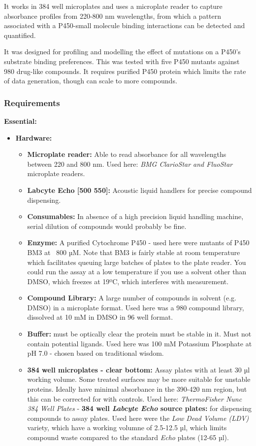 \documentclass{article}
\begin{document}
It works in 384 well microplates and uses a microplate reader to capture absorbance profiles from 220-800 nm wavelengths, from which a pattern associated with a P450-small molecule binding interactions can be detected and quantified.  

It was designed for profiling and modelling the effect of mutations on a P450's substrate binding preferences.
This was tested with five P450 mutants against 980 drug-like compounds.
It requires purified P450 protein which limits the rate of data generation, though can scale to more compounds.


\subsubsection{Requirements}

\textbf{Essential:}

\begin{itemize}
\item \textbf{Hardware:}
	\begin{itemize}
	\item \textbf{Microplate reader:} Able to read absorbance for all wavelengths between 220 and 800 nm.
		Used here: \textit{BMG ClarioStar and FluoStar} microplate readers.
	\item \textbf{Labcyte Echo [500 550]:} Acoustic liquid handlers for precise compound dispensing.
\item \textbf{Consumables:}
	In absence of a high precision liquid handling machine, serial dilution of compounds would probably be fine.
	\item \textbf{Enzyme:} A purified Cytochrome P450 - used here were mutants of P450 BM3 at ~800 µM. 
	Note that BM3 is fairly stable at room temperature which facilitates queuing large batches of plates to the plate reader.
	You could run the assay at a low temperature if you use a solvent other than DMSO, which freezes at 19ºC, which interferes with measurement.
	\item \textbf{Compound Library:} A large number of compounds in solvent (e.g. DMSO) in a microplate format.
	Used here was a 980 compound library, dissolved at 10 mM in DMSO in 96 well format.
	\item \textbf{Buffer:} must be optically clear the protein must be stable in it.
	Must not contain potential ligands.
	Used here was 100 mM Potassium Phosphate at pH 7.0 - chosen based on traditional wisdom.
	\item \textbf{384 well microplates - clear bottom:}
	Assay plates with at least 30 µl working volume. 
	Some treated surfaces may be more suitable for unstable proteins.
	Ideally have minimal absorbance in the 390-420 nm region, but this can be corrected for with controls.
			Used here: \textit{ThermoFisher Nunc 384 Well Plates}
			- \textbf{384 well \textit{Labcyte Echo} source plates:} for dispensing compounds to assay plates. 
			Used here were the \textit{Low Dead Volume (LDV)} variety, which have a working volumne of 2.5-12.5 µl, 
			which limits compound waste compared to the standard \textit{Echo} plates (12-65 µl).
	\end{itemize}
\end{itemize}
\end{document}
